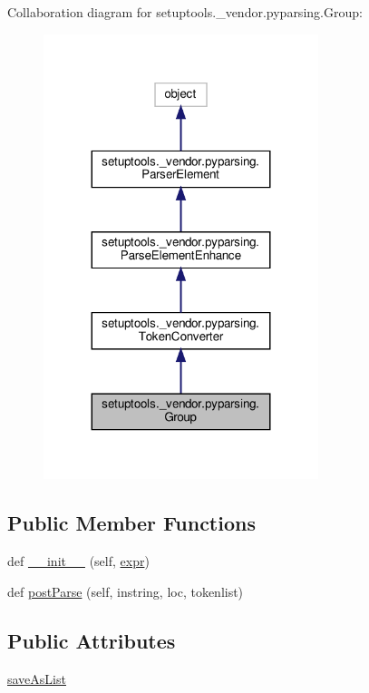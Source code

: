 Collaboration diagram for setuptools.\+\_\+vendor.\+pyparsing.\+Group\+:
\nopagebreak
\begin{figure}[H]
\begin{center}
\leavevmode
\includegraphics[width=227pt]{classsetuptools_1_1__vendor_1_1pyparsing_1_1Group__coll__graph}
\end{center}
\end{figure}
\subsection*{Public Member Functions}
\begin{DoxyCompactItemize}
\item 
def \hyperlink{classsetuptools_1_1__vendor_1_1pyparsing_1_1Group_ac8ddd6ac40275611871ddf1ce6eaa6da}{\+\_\+\+\_\+init\+\_\+\+\_\+} (self, \hyperlink{classsetuptools_1_1__vendor_1_1pyparsing_1_1ParseElementEnhance_a445450bd765a74cc1d1567e40cade40d}{expr})
\item 
def \hyperlink{classsetuptools_1_1__vendor_1_1pyparsing_1_1Group_a83c4ae0d82479b6fcac000adab3a3bc3}{post\+Parse} (self, instring, loc, tokenlist)
\end{DoxyCompactItemize}
\subsection*{Public Attributes}
\begin{DoxyCompactItemize}
\item 
\hyperlink{classsetuptools_1_1__vendor_1_1pyparsing_1_1Group_abb9329fa2f2c5c248c18b80cdd6f39c0}{save\+As\+List}
\end{DoxyCompactItemize}
